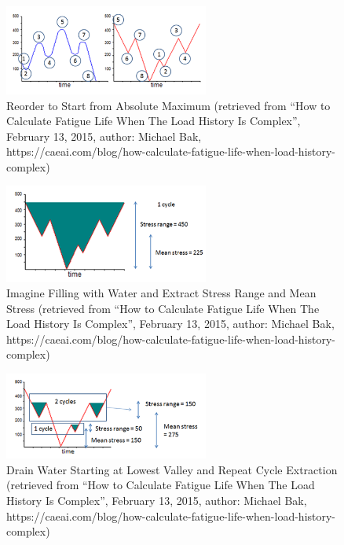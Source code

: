 \begin{figure}[!h]
	\centering
	\includegraphics[width=0.6\textwidth]{figures//Reorder.png} 
	\caption{Reorder to Start from Absolute Maximum (retrieved  from ``How to Calculate Fatigue Life When The Load History Is Complex'', February 13, 2015, author: Michael Bak, https://caeai.com/blog/how-calculate-fatigue-life-when-load-history-complex)}
	\label{Reorder}
\end{figure}

\begin{figure}[!h]
	\centering
	\includegraphics[width=0.6\textwidth]{figures//StressRange.png} 
	\caption{Imagine Filling with Water and Extract Stress Range and Mean Stress (retrieved  from ``How to Calculate Fatigue Life When The Load History Is Complex'', February 13, 2015, author: Michael Bak, https://caeai.com/blog/how-calculate-fatigue-life-when-load-history-complex)}
	\label{StressRange}
\end{figure}

\begin{figure}[!h]
	\centering
	\includegraphics[width=0.6\textwidth]{figures//DrainWater.png} 
	\caption{Drain Water Starting at Lowest Valley and Repeat Cycle Extraction (retrieved  from ``How to Calculate Fatigue Life When The Load History Is Complex'', February 13, 2015, author: Michael Bak, https://caeai.com/blog/how-calculate-fatigue-life-when-load-history-complex)}
	\label{DrainWater}
\end{figure}   

